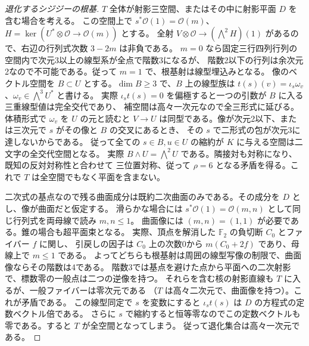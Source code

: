\begin{proof}[退化するシジジーの根基]
$T$ 全体が射影三空間、またはその中に射影平面 $D$ を含む場合を考える。
この空間上で $s^*\mathcal O(1)=\mathcal O(m)$、$H=\ker(U^*\otimes\mathcal O\to\mathcal O(m))$ とする。
全射 $V\otimes\mathcal O\to(\bigwedge^2 H)(1)$ があるので、右辺の行列式次数 $3-2m$ は非負である。
$m=0$ なら固定三行四列行列の空間内で次元3以上の線型系が全点で階数3になるが、
階数2以下の行列は余次元2なので不可能である。従って $m=1$ で、根基射は線型埋込みとなる。
像のベクトル空間を $B\subset U$ とする。$\dim B\ge3$ で、$B$ 上の線型族は
$t(s)(v)=\iota_s\omega_v$、$\omega_v\in\bigwedge^3U^*$ と書ける。
実際 $\iota_s t(s)=0$ を偏極すると一つの引数が $B$ に入る三重線型値は完全交代であり、
補空間は高々一次元なので全三形式に延びる。体積形式で $\omega_v$ を $U$ の元と読むと
$V\to U$ は同型である。像が次元2以下、または三次元で $s$ がその像と $B$ の交叉にあるとき、
その $s$ で二形式の包が次元3に達しないからである。
従って全ての $s\in B, u\in U$ の縮約が $K$ に与える空間は二文字の全交代空間となる。
実際 $B\wedge U=\bigwedge^2U$ である。隣接対も対称になり、既知の反対対称性と合わせて
三位置対称、従って $\rho=6$ となる矛盾を得る。これで $T$ は全空間でもなく平面を含まない。

二次式の基点なので残る曲面成分は既約二次曲面のみである。その成分を $D$ とし、像が曲面だと仮定する。
滑らかな場合には $s^*\mathcal O(1)=\mathcal O(m,n)$ として同じ行列式を両母線で読み $m,n\le1$。
曲面像には $(m,n)=(1,1)$ が必要である。錐の場合も超平面束となる。
実際、頂点を解消した $\mathbb F_2$ の負切断 $C_0$ とファイバー $f$ に関し、
引戻しの因子は $C_0$ 上の次数0から $m(C_0+2f)$ であり、母線上で $m\le1$ である。
よってどちらも根基射は周囲の線型写像の制限で、曲面像ならその階数は4である。
階数3では基点を避けた点から平面への二次射影で、標数零の一般点は二つの逆像を持つ。
それらを含む核の射影直線も $T$ に入るが、一般ファイバーは零次元である
（$T$ は高々二次元で、曲面像を持つ）。これが矛盾である。
この線型同定で $s$ を変数にすると $\iota_s t(s)$ は $D$ の方程式の定数ベクトル倍である。
さらに $s$ で縮約すると恒等零なのでこの定数ベクトルも零である。すると $T$ が全空間となってしまう。
従って退化集合は高々一次元である。
\end{proof}

